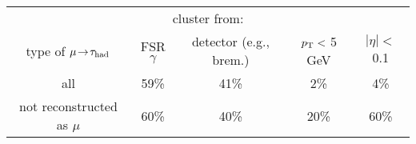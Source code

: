 \begin{tabular}{c|cc|cc}
  \multicolumn{1}{c}{}       & \multicolumn{2}{c}{cluster from:}     &                &                 \\
  type of $\mu \!\rightarrow\!\tau_\text{had}$           & FSR $\gamma$ & detector (e.g., brem.) & $p_{\mathrm{T}} < $ 5 GeV & $|\eta| < $ 0.1 \\
  \hline
  all                        & 59\%         & 41\%                   & 2\%            & 4\%             \\
  not reconstructed as $\mu$ & 60\%         & 40\%                   & 20\%           & 60\%            \\
\end{tabular}


